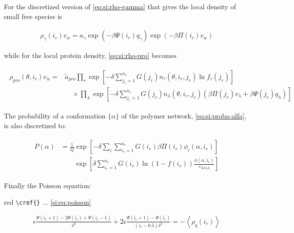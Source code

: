 \documentclass[journal=jacsat,manuscript=suppinfo]{achemso}
\begin{document}
For the discretized version of \cref{eq:si:rho-gamma} that gives the local density of small free species is

\begin{align}
	\rho_\gamma(i_r)v_w = a_\gamma \exp{\left(-\beta \Psi(i_r)q_\gamma\right)} \exp{\left(-\beta\Pi(i_r) v_w\right)}
\end{align}



while for the local protein density, \cref{eq:si:rho-pro} becomes



\begin{align}
	\begin{aligned}
		\rho_{pro}(\theta, i_r)v_w = &\tilde{a}_{pro} \prod_\tau\exp\left[- \delta \sum^{n_r}_{j_r = 1} G(j_r) n_\tau(\theta,i_r,j_r) \ln f_\tau(j_r)\right] \\
		& \hspace{1em} \times \prod_\lambda \exp \left[- \delta \sum^{n_r}_{j_r = 1} G(j_r) n_\lambda(\theta,i_r, j_r)\left(\beta\Pi(j_r) v_\lambda+ \beta \Psi(j_r)q_\lambda\right) \right]
	\end{aligned}
\end{align}




The probability of a conformation $\{\alpha\}$ of the polymer network, \ref{eq:si:proba-alfa}, is also discretized to:

\begin{align}
	\begin{aligned}
		P(\alpha)&=\frac{1}{Q}\exp\left[- \delta\sum_i{\sum_{i_r =1}^{n_r}{G(i_r)\beta\Pi(i_r)\phi_i(\alpha,i_r)}}\right] \\
		&\hspace{2em} \exp\left[\delta\sum_{i_r =1}^{n_r}{G(i_r)\ln(1-f(i_r))\frac{\phi(\alpha,i_r)}{v_{MAA}}}\right]
	\end{aligned}
\end{align}

Finally the Poisson equation:
\begin{color}{red}
	\verb|\cref{}| ... \ref{si:eq:poisson}
\end{color}

\begin{align}
	\epsilon \frac{\Psi(i_r +1) -2 \Psi(i_r) + \Psi(i_r -1)}{\delta ^2} + 2\epsilon \frac{\Psi(i_r +1) -\Psi(i_r)}{(i_r -0.5)\delta ^2}= -\left<\rho_q(i_r)\right>
	\label{si:eq:poisson-ir}
\end{align}
\end{document}
